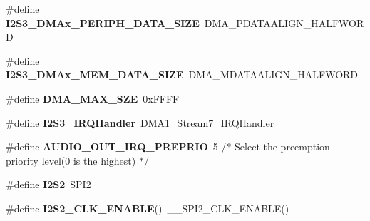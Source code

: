 \begin{DoxyCompactItemize}
\#define {\bfseries I2\+S3\+\_\+\+D\+M\+Ax\+\_\+\+P\+E\+R\+I\+P\+H\+\_\+\+D\+A\+T\+A\+\_\+\+S\+I\+ZE}~D\+M\+A\+\_\+\+P\+D\+A\+T\+A\+A\+L\+I\+G\+N\+\_\+\+H\+A\+L\+F\+W\+O\+RD
\item 
\mbox{\label{group___s_t_m32_f4___d_i_s_c_o_v_e_r_y___a_u_d_i_o___o_u_t___exported___constants_gaf896115813265ae38c5124b0b8fe5237}} 
\#define {\bfseries I2\+S3\+\_\+\+D\+M\+Ax\+\_\+\+M\+E\+M\+\_\+\+D\+A\+T\+A\+\_\+\+S\+I\+ZE}~D\+M\+A\+\_\+\+M\+D\+A\+T\+A\+A\+L\+I\+G\+N\+\_\+\+H\+A\+L\+F\+W\+O\+RD
\item 
\mbox{\label{group___s_t_m32_f4___d_i_s_c_o_v_e_r_y___a_u_d_i_o___o_u_t___exported___constants_ga42ed3f4f70b63747ef7d6af409d273e6}} 
\#define {\bfseries D\+M\+A\+\_\+\+M\+A\+X\+\_\+\+S\+ZE}~0x\+F\+F\+FF
\item 
\mbox{\label{group___s_t_m32_f4___d_i_s_c_o_v_e_r_y___a_u_d_i_o___o_u_t___exported___constants_ga3fa6bc6a941e6538d2ef4dd6cab15eba}} 
\#define {\bfseries I2\+S3\+\_\+\+I\+R\+Q\+Handler}~D\+M\+A1\+\_\+\+Stream7\+\_\+\+I\+R\+Q\+Handler
\item 
\mbox{\label{group___s_t_m32_f4___d_i_s_c_o_v_e_r_y___a_u_d_i_o___o_u_t___exported___constants_ga5fd4d20855ce419cd848a08ea74a33f6}} 
\#define {\bfseries A\+U\+D\+I\+O\+\_\+\+O\+U\+T\+\_\+\+I\+R\+Q\+\_\+\+P\+R\+E\+P\+R\+IO}~5   /$\ast$ Select the preemption priority level(0 is the highest) $\ast$/
\item 
\mbox{\label{group___s_t_m32_f4___d_i_s_c_o_v_e_r_y___a_u_d_i_o___o_u_t___exported___constants_gaebf42cce5bf5b6717ad2b4be3e1f53ae}} 
\#define {\bfseries I2\+S2}~S\+P\+I2
\item 
\mbox{\label{group___s_t_m32_f4___d_i_s_c_o_v_e_r_y___a_u_d_i_o___o_u_t___exported___constants_ga698541e4b275d3a683d5a9f000db30a3}} 
\#define {\bfseries I2\+S2\+\_\+\+C\+L\+K\+\_\+\+E\+N\+A\+B\+LE}()~\+\_\+\+\_\+\+S\+P\+I2\+\_\+\+C\+L\+K\+\_\+\+E\+N\+A\+B\+LE()

\end{DoxyCompactItemize}
